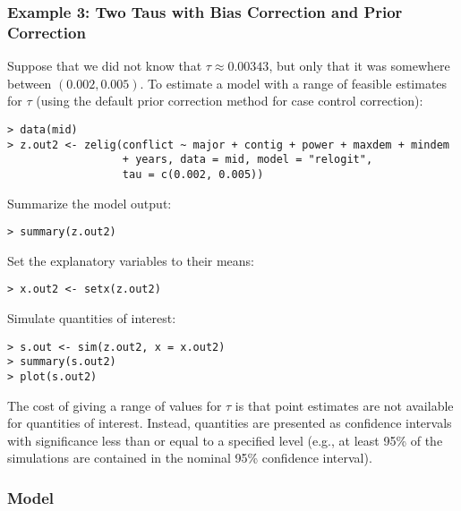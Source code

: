 \subsubsection*{Example 3: Two Taus with Bias Correction and Prior Correction}

Suppose that we did not know that $\tau \approx 0.00343$, but only
that it was somewhere between $(0.002, 0.005)$.  To estimate a model
with a range of feasible estimates for $\tau$ (using the default prior
correction method for case control correction):
\begin{verbatim}
> data(mid)
> z.out2 <- zelig(conflict ~ major + contig + power + maxdem + mindem 
                  + years, data = mid, model = "relogit", 
                  tau = c(0.002, 0.005))
\end{verbatim}
Summarize the model output:  
\begin{verbatim}
> summary(z.out2)
\end{verbatim}
Set the explanatory variables to their means:  
\begin{verbatim}
> x.out2 <- setx(z.out2)
\end{verbatim}
Simulate quantities of interest:
\begin{verbatim}
> s.out <- sim(z.out2, x = x.out2)
> summary(s.out2)
> plot(s.out2)
\end{verbatim}
The cost of giving a range of values for $\tau$ is that point
estimates are not available for quantities of interest.  Instead,
quantities are presented as confidence intervals with significance
less than or equal to a specified level (e.g., at least 95\% of the
simulations are contained in the nominal 95\% confidence interval).  

\subsubsection{Model}

